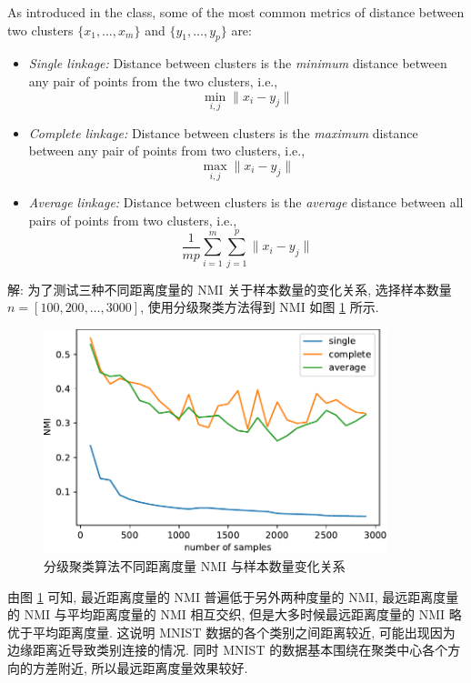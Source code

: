 \documentclass[openany]{ctexbook}
\theoremstyle{kaiti}
\theoremstyle{normal}
\begin{document}
As introduced in the class, some of the most common metrics of distance between two clusters $\{x_{1},\dots, x_{m}\}$ and $\{y_{1},\dots, y_{p}\}$ are:
\begin{itemize}
  \item \emph{Single linkage:} Distance between clusters is the \emph{minimum} distance between any pair of points from the two clusters, i.e.,
  \begin{equation}
    \min_{i, j}\|x_{i}-y_{j}\|
  \end{equation}

  \item \emph{Complete linkage:} Distance between clusters is the \emph{maximum} distance between any pair of points from two clusters, i.e.,
  \begin{equation}
    \max_{i, j}\|x_{i}-y_{j}\|
  \end{equation}

  \item \emph{Average linkage:} Distance between clusters is the \emph{average} distance between all pairs of points from two clusters, i.e.,
  \begin{equation}
    \frac{1}{mp}\sum_{i=1}^{m}\sum_{j=1}^{p}\|x_{i}-y_{j}\|
  \end{equation}
\end{itemize}

解: 为了测试三种不同距离度量的 NMI 关于样本数量的变化关系, 选择样本数量 $n=[100,200,\dots,3000]$, 使用分级聚类方法得到 NMI 如图 \ref{fig:hierarchical_nmi} 所示. 

\begin{figure}[htbp]
  \centering
  \includegraphics[width=10cm]{hierarchical_nmi.pdf}
  \caption{分级聚类算法不同距离度量 NMI 与样本数量变化关系}
  \label{fig:hierarchical_nmi}
\end{figure}

由图 \ref{fig:hierarchical_nmi} 可知, 最近距离度量的 NMI 普遍低于另外两种度量的 NMI, 最远距离度量的 NMI 与平均距离度量的 NMI 相互交织, 但是大多时候最远距离度量的 NMI 略优于平均距离度量. 这说明 MNIST 数据的各个类别之间距离较近, 可能出现因为边缘距离近导致类别连接的情况. 同时 MNIST 的数据基本围绕在聚类中心各个方向的方差附近, 所以最远距离度量效果较好.
\end{document}
